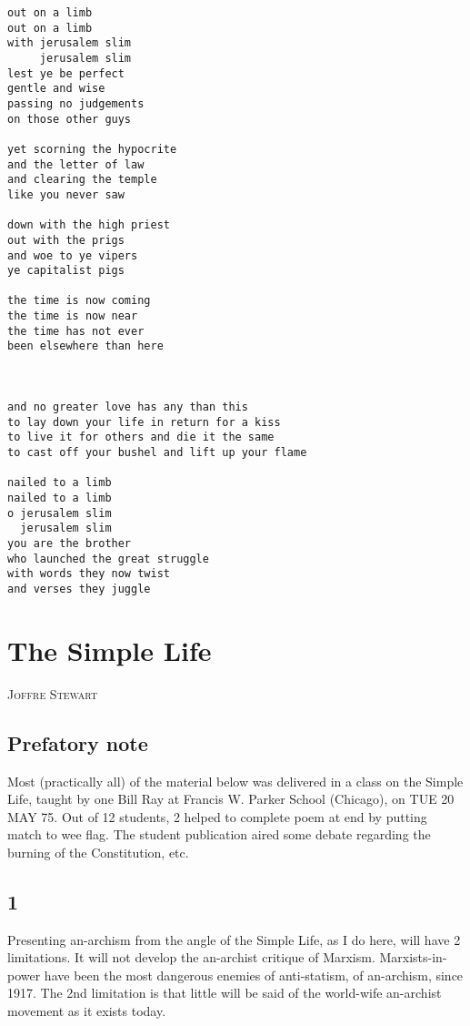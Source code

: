\documentclass[12pt, onecolumn, letterpaper, oneside]{book}
\makeatletter
\newcommand\chapterauthor[1]{\authortoc{#1}\printchapterauthor{#1}}
\newcommand{\printchapterauthor}[1]{%
  {\parindent0pt\vspace*{-25pt}%
  \linespread{1.1}\large\scshape#1%
  \par\nobreak\vspace*{35pt}}
  \@afterheading%
}
\newcommand{\authortoc}[1]{%
  \addtocontents{toc}{\vskip-10pt}%
  \addtocontents{toc}{%
    \protect\contentsline{chapter}%
    {\hskip1.3em\mdseries\scshape\protect\scriptsize#1}{}{}}
  \addtocontents{toc}{\vskip5pt}%
}
\makeatother
\begin{document}
\begin{verbatim}
out on a limb
out on a limb
with jerusalem slim
     jerusalem slim
lest ye be perfect
gentle and wise
passing no judgements
on those other guys

yet scorning the hypocrite
and the letter of law
and clearing the temple
like you never saw

down with the high priest
out with the prigs
and woe to ye vipers
ye capitalist pigs

the time is now coming
the time is now near
the time has not ever
been elsewhere than here



and no greater love has any than this
to lay down your life in return for a kiss
to live it for others and die it the same
to cast off your bushel and lift up your flame

nailed to a limb
nailed to a limb
o jerusalem slim
  jerusalem slim
you are the brother
who launched the great struggle
with words they now twist
and verses they juggle
\end{verbatim}

\chapter{The Simple Life}
\chapterauthor{Joffre Stewart}

\section*{Prefatory note}
Most (practically all) of the material below was delivered in a class on the Simple Life, taught by one Bill Ray at Francis W. Parker School (Chicago), on TUE 20 MAY 75. Out of 12 students, 2 helped to complete poem at end by putting match to wee flag. The student publication aired some debate regarding the burning of the Constitution, etc.

\section*{1}
Presenting an-archism from the angle of the Simple Life, as I do here, will have 2 limitations. It will not develop the an-archist critique of Marxism. Marxists-in-power have been the most dangerous enemies of anti-statism, of an-archism, since 1917. The 2nd limitation is that little will be said of the world-wife an-archist movement as it exists today.
\end{document}

